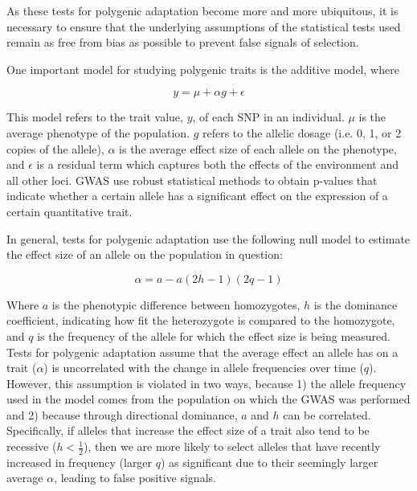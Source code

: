 \documentclass[a4paper,10pt]{article}
\begin{document}
As these tests for polygenic adaptation become more and more ubiquitous, it is necessary to ensure that the underlying
assumptions of the statistical tests used remain as free from bias as
possible to prevent false signals of selection. 

One important model for studying polygenic traits is the additive model, where

\begin{equation}
  y = \mu + \alpha g + \epsilon
\end{equation}

This model refers to the trait value, $y$, of each SNP in an
individual. $\mu$ is the average phenotype of the population. $g$ refers to the
allelic dosage (i.e. 0, 1, or 2 copies of the allele), $\alpha$ is the average effect size
of each allele on the phenotype, and $ \epsilon $ is a residual term which captures both the
effects of the environment and all other loci. GWAS use robust statistical methods
to obtain p-values that indicate whether a certain allele has a
significant effect on the expression of a certain quantitative
trait.

In general, tests for polygenic adaptation use the following null model to
estimate the effect size of an allele on the population in question:

\begin{equation}
  \alpha = a - a(2h - 1)(2q - 1)
\end{equation}

Where $a$ is the phenotypic difference between homozygotes, $h$ is the
dominance coefficient, indicating how fit the heterozygote is compared
to the homozygote, and $q$ is the frequency of the allele for which
the effect size is being measured. Tests for polygenic adaptation
assume that the average effect an allele has on a trait ($\alpha$) is
uncorrelated with the change in allele frequencies over time
($q$). However, this assumption is violated in two ways, because 1)
the allele frequency used in the model comes from the population on
which the GWAS was performed and 2) because through directional
dominance, $a$ and $h$ can be correlated. Specifically, if alleles that
increase the effect size of a trait also tend to be recessive
($h<\frac{1}{2}$), then we are more likely to select alleles that have
recently increased in frequency (larger $q$) as significant due to
their seemingly larger average $\alpha$, leading to false
positive signals. 
\end{document}
